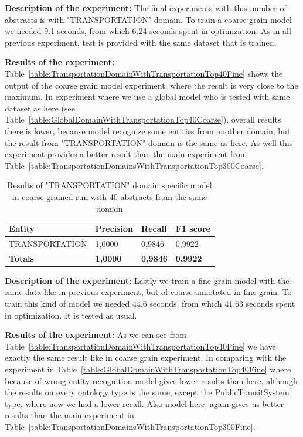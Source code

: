 \documentclass[thesis=M,english]{FITthesis}[2018/05/30]
\begin{document}

	\textbf{Description of the experiment:} The final experiments with this number of abstracts is with "TRANSPORTATION" domain. To train a coarse grain model we needed 9.1 seconds, from which 6.24 seconds spent in optimization. As in all previous experiment, test is provided with the same dataset that is trained.

	\textbf{Results of the experiment:} Table~\ref{table:TransportationDomainWithTransportationTop40Fine} shows the output of the coarse grain model experiment, where the result is very close to the maximum. In experiment where we use a global model who is tested with same dataset as here (see Table~\ref{table:GlobalDomainWithTransportationTop40Coarse}), overall results there is lower, because model recognize some entities from another domain, but the result from "TRANSPORTATION" domain is the same as here. As well this experiment provides a better result than the main experiment from Table~\ref{table:TransportationDomainsWithTransportationTop300Coarse}.  
	
	\begin{table}[H]\centering
		\begin{tabular}{|l|l|l|l|}
			\hline {\textbf{Entity}} & {\textbf{Precision}} & {\textbf{Recall}} & {\textbf{F1 score}}\\\hline
				TRANSPORTATION & 1,0000 & 0,9846 & 0,9922\\\hline
				\textbf{Totals} & \textbf{1,0000} & \textbf{0,9846} & \textbf{0,9922}\\\hline
		\end{tabular}
		\caption{Results of "TRANSPORTATION" domain specific model in coarse grained run with 40 abstracts from the same domain \label{table:TransportationDomainWithTransportationTop40Coarse}}
	\end{table}	

	\textbf{Description of the experiment:} Lastly we train a fine grain model with the same data like in previous experiment, but of coarse annotated in fine grain. To train this kind of model we needed 44.6 seconds, from which 41.63 seconds spent in optimization. It is tested as usual.
	 

	\textbf{Results of the experiment:} As we can see from Table~\ref{table:TransportationDomainWithTransportationTop40Fine} we have exactly the same result like in coarse grain experiment. In comparing with the experiment in Table~\ref{table:GlobalDomainWithTransportationTop40Fine} where because of wrong entity recognition model gives lower results than here, although the results on every ontology type is the same, except the PublicTransitSystem type, where now we had a lower recall. Also model here, again gives us better results than the main experiment in Table~\ref{table:TransportationDomainsWithTransportationTop300Fine}. 
\end{document}

